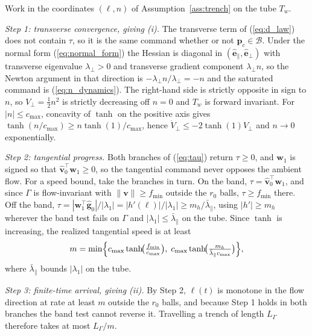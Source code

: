 \documentclass[lettersize,journal]{IEEEtran}
\begin{document}
\begin{IEEEproof}
Work in the coordinates $(\ell, n)$ of Assumption~\ref{ass:trench} on the
tube $T_w$.

\textit{Step 1: transverse convergence, giving (i).} The transverse term
of (\ref{eq:d_law}) does not contain $\tau$, so it is the same command
whether or not $\mathbf{p}_c \in \mathcal{B}$. Under the normal form
(\ref{eq:normal_form}) the Hessian is diagonal in
$(\hat{\mathbf{e}}_\parallel, \hat{\mathbf{e}}_\perp)$ with transverse
eigenvalue $\lambda_\perp > 0$ and transverse gradient component
$\lambda_\perp n$, so the Newton argument in that direction is
$-\lambda_\perp n/\lambda_\perp = -n$ and the saturated command is
(\ref{eq:n_dynamics}). The right-hand side is strictly opposite in sign
to $n$, so $V_\perp = \tfrac{1}{2}n^2$ is strictly decreasing off $n = 0$
and $T_w$ is forward invariant. For $|n| \leq c_{\max}$, concavity of
$\tanh$ on the positive axis gives $\tanh(n/c_{\max}) \geq
n\tanh(1)/c_{\max}$, hence $\dot{V}_\perp \leq -2\tanh(1)V_\perp$ and
$n \to 0$ exponentially.

\textit{Step 2: tangential progress.} Both branches of (\ref{eq:tau})
return $\tau \geq 0$, and $\mathbf{w}_1$ is signed so that
$\hat{\mathbf{v}}_0^\top\mathbf{w}_1 \geq 0$, so the tangential command
never opposes the ambient flow. For a speed bound, take the branches in
turn. On the band, $\tau = \hat{\mathbf{v}}_0^\top\mathbf{w}_1$, and
since $\Gamma$ is flow-invariant with $\|\mathbf{v}\| \geq f_{\min}$
outside the $r_0$ balls, $\tau \geq f_{\min}$ there. Off the band, $\tau
= |\mathbf{w}_1^\top\hat{\mathbf{g}}_0|/|\lambda_1| =
|h'(\ell)|/|\lambda_1| \geq m_h/\bar{\lambda}_\parallel$, using $|h'|
\geq m_h$ wherever the band test fails on $\Gamma$ and $|\lambda_1| \leq
\bar{\lambda}_\parallel$ on the tube. Since $\tanh$ is increasing, the
realized tangential speed is at least
\begin{equation}
    m = \min\Bigl\{
    c_{\max}\tanh\!\bigl(\tfrac{f_{\min}}{c_{\max}}\bigr),\;
    c_{\max}\tanh\!\bigl(\tfrac{m_h}
    {\bar{\lambda}_\parallel c_{\max}}\bigr)
    \Bigr\},
    \label{eq:progress_rate}
\end{equation}
where $\bar{\lambda}_\parallel$ bounds $|\lambda_1|$ on the tube.

\textit{Step 3: finite-time arrival, giving (ii).} By Step 2, $\ell(t)$
is monotone in the flow direction at rate at least $m$ outside the $r_0$
balls, and because Step 1 holds in both branches the band test cannot
reverse it. Travelling a trench of length $L_\Gamma$ therefore takes at
most $L_\Gamma/m$.
\end{IEEEproof}
\end{document}
